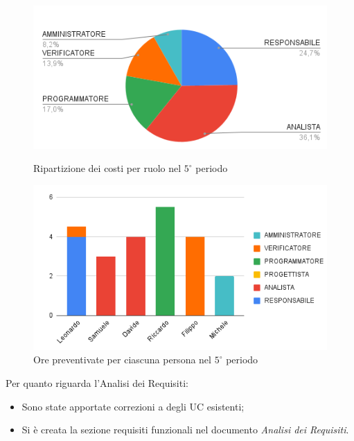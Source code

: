 \begin{figure}[H]
  \centering
  \includegraphics[width=0.6\linewidth]{grafici/5_periodo_torta.png}
  \caption{Ripartizione dei costi per ruolo nel $5^\circ$ periodo}
        \vspace{10mm}
  \includegraphics[width=0.7\linewidth]{grafici/5_periodo_istogramma.png}
  \caption{Ore preventivate per ciascuna persona nel $5^\circ$ periodo}
\end{figure}
Per quanto riguarda l'Analisi dei Requisiti:
\begin{itemize}
    \item Sono state apportate correzioni a degli UC esistenti;
    \item Si è creata la sezione requisiti funzionali nel documento \emph{Analisi dei Requisiti}.
\end{itemize} 

